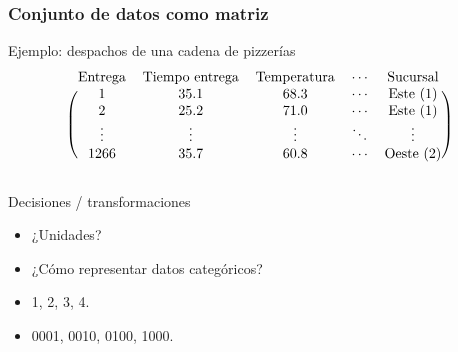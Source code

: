 \documentclass[table]{beamer}
\begin{document}
\begin{frame}
    \frametitle{Conjunto de datos como matriz}
    \begin{exampleblock}{Ejemplo: despachos de una cadena de pizzerías}
        \begin{equation*}
            \begin{blockarray}{*{5}c}
                \text{Entrega} & \text{Tiempo entrega} & \text{Temperatura} & \cdots & \text{Sucursal} \\
                \begin{block}{(*{5}{c})}
                    1 & 35.1 & 68.3 & \cdots & \text{Este } \parens{1} \\
                    2 & 25.2 & 71.0 & \cdots & \text{Este } \parens{1} \\
                    \vdots & \vdots & \vdots & \ddots & \vdots \\
                    1266 & 35.7 & 60.8 & \cdots & \text{Oeste } \parens{2} \\
                \end{block}
            \end{blockarray}
        \end{equation*}
    \end{exampleblock}
    \begin{block}{Decisiones / transformaciones}
        \begin{itemize}
            \item ¿Unidades?
            \item ¿Cómo representar datos categóricos?
            \item 1, 2, 3, 4.
            \item 0001, 0010, 0100, 1000.
        \end{itemize}
    \end{block}
\end{frame}
\end{document}

